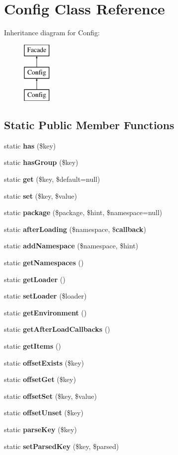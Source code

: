 \section{Config Class Reference}
\label{class_config}
Inheritance diagram for Config\+:\begin{figure}[H]
\begin{center}
\leavevmode
\includegraphics[height=3.000000cm]{class_config}
\end{center}
\end{figure}
\subsection*{Static Public Member Functions}
\begin{DoxyCompactItemize}
\item 
static {\bf has} (\$key)
\item 
static {\bf has\+Group} (\$key)
\item 
static {\bf get} (\$key, \$default=null)
\item 
static {\bf set} (\$key, \$value)
\item 
static {\bf package} (\$package, \$hint, \$namespace=null)
\item 
static {\bf after\+Loading} (\$namespace, \${\bf callback})
\item 
static {\bf add\+Namespace} (\$namespace, \$hint)
\item 
static {\bf get\+Namespaces} ()
\item 
static {\bf get\+Loader} ()
\item 
static {\bf set\+Loader} (\$loader)
\item 
static {\bf get\+Environment} ()
\item 
static {\bf get\+After\+Load\+Callbacks} ()
\item 
static {\bf get\+Items} ()
\item 
static {\bf offset\+Exists} (\$key)
\item 
static {\bf offset\+Get} (\$key)
\item 
static {\bf offset\+Set} (\$key, \$value)
\item 
static {\bf offset\+Unset} (\$key)
\item 
static {\bf parse\+Key} (\$key)
\item 
static {\bf set\+Parsed\+Key} (\$key, \$parsed)
\end{DoxyCompactItemize}

